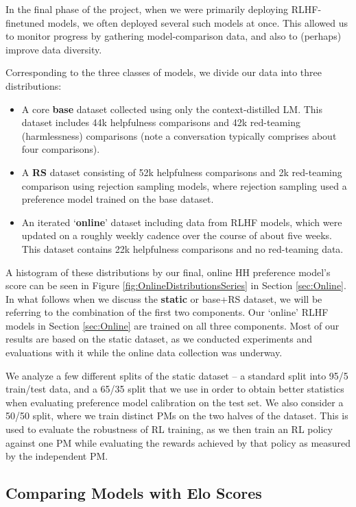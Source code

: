 In the final phase of the project, when we were primarily deploying RLHF-finetuned models, we often deployed several such models at once.  This allowed us to monitor progress by gathering model-comparison data, and also to (perhaps) improve data diversity.

Corresponding to the three classes of models, we divide our data into three distributions:

\begin{itemize}
    \item A core {\bf base} dataset collected using only the context-distilled LM.  This dataset includes  44k helpfulness comparisons and 42k red-teaming (harmlessness) comparisons (note a conversation typically comprises about four comparisons).  
    \item A {\bf RS} dataset consisting of 52k helpfulness comparisons and 2k red-teaming comparison using rejection sampling models, where rejection sampling used a preference model trained on the base dataset.
    \item An iterated `{\bf online}' dataset including data from RLHF models, which were updated on a roughly weekly cadence over the course of about five weeks.  This dataset contains 22k helpfulness comparisons and no red-teaming data.
\end{itemize}

A histogram of these distributions by our final, online HH preference model's score can be seen in Figure \ref{fig:OnlineDistributionsSeries} in Section \ref{sec:Online}.
In what follows when we discuss the {\bf static} or base+RS dataset, we will be referring to the combination of the first two components.  Our `online' RLHF models in Section \ref{sec:Online} are trained on all three components.  Most of our results are based on the static dataset, as we conducted experiments and evaluations with it while the online data collection was underway. 

We analyze a few different splits of the static dataset -- a standard split into 95/5 train/test data, and a 65/35 split that we use in order to obtain better statistics when evaluating preference model calibration on the test set.  We also consider a 50/50 split, where we train distinct PMs on the two halves of the dataset.  This is used to evaluate the robustness of RL training, as we then train an RL policy against one PM while evaluating the rewards achieved by that policy as measured by the independent PM.

\subsection{Comparing Models with Elo Scores}
\label{sec:ModelComparisonData}

